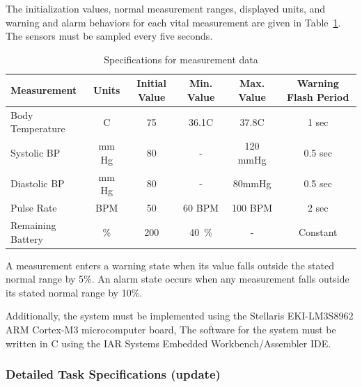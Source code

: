 \documentclass[12pt]{article} %
\begin{document}
The initialization values, normal measurement ranges, displayed units, and 
warning and alarm behaviors for each vital measurement are given in 
Table~\ref{tab:sensorDefs}. The sensors must be sampled every five seconds.

\begin{table}[h]
  \centering
  \begin{tabular}{|l|*{5}{c}|}
    \hline
    Measurement & Units & Initial Value & Min. Value & Max. Value & Warning Flash Period \\ \hline
    Body Temperature & C & 75 & 36.1C & 37.8C & 1 sec \\ \hline
    Systolic BP  & mm Hg & 80 & - & 120 mmHg & 0.5 sec \\ \hline
    Diastolic BP & mm Hg & 80 & - & 80mmHg & 0.5 sec \\ \hline
    Pulse Rate & BPM & 50 & 60 BPM & 100 BPM & 2 sec \\ \hline
    Remaining Battery & \% & 200 & 40~\% & - & Constant \\ \hline
  \end{tabular}
  \caption{Specifications for measurement data}
  \label{tab:sensorDefs}
\end{table}

A measurement enters a warning state when its value falls outside the stated 
normal range by 5\%. An alarm state occurs when any measurement falls outside
 its stated normal range by 10\%.

Additionally, the system must be implemented using the Stellaris 
EKI-LM3S8962 ARM Cortex-M3 microcomputer board, The software for the system 
must be written in C using the IAR Systems Embedded Workbench/Assembler IDE.

\subsubsection{Detailed Task Specifications (update)}
\end{document}
